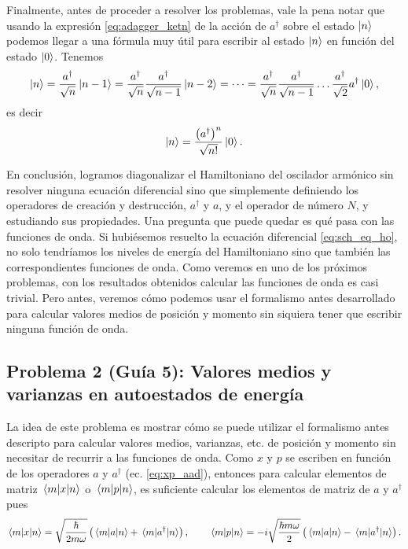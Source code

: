 \documentclass[10pt, a4paper]{article}
\newcommand{\xprefactsq}{\frac{\hbar}{2m\omega}}
\newcommand{\xprefact}{\sqrt{\xprefactsq}}
\newcommand{\pprefactsq}{\frac{\hbar m \omega}{2}}
\newcommand{\pprefact}{\sqrt{\pprefactsq}}
\numberwithin{equation}{subsection}
\begin{document}
\bigbreak

Finalmente, antes de proceder a resolver los problemas, vale la pena notar que
usando la expresión \eqref{eq:adagger_ketn} de la acción de $a^\dagger$ sobre
el estado $\ket{n}$ podemos llegar a una fórmula muy útil para escribir al
estado $\ket{n}$ en función del estado $\ket{0}$. Tenemos
\begin{equation}
  \ket{n} = \frac{a^\dagger}{\sqrt{n}}\ket{n-1} = \frac{a^\dagger}{\sqrt{n}}
    \frac{a^\dagger}{\sqrt{n-1}} \ket{n-2} = \dots = \frac{a^\dagger}{\sqrt{n}}
    \frac{a^\dagger}{\sqrt{n-1}} \dots \frac{a^\dagger}{\sqrt{2}}
    a^\dagger\ket{0},
\end{equation}
es decir
\begin{equation} \label{eq:ketn_ket0}
  \ket{n} = \frac{\left(a^\dagger\right)^n}{\sqrt{n!}}\ket{0}.
\end{equation}

\bigbreak

En conclusión, logramos diagonalizar el Hamiltoniano del oscilador armónico sin
resolver ninguna ecuación diferencial sino que simplemente definiendo los
operadores de creación y destrucción, $a^\dagger$ y $a$, y el operador de
número $N$, y estudiando sus propiedades. Una pregunta que puede quedar es qué
pasa con las funciones de onda. Si hubiésemos resuelto la ecuación diferencial
\eqref{eq:sch_eq_ho}, no solo tendríamos los niveles de energía del
Hamiltoniano sino que también las correspondientes funciones de onda. Como
veremos en uno de los próximos problemas, con los resultados obtenidos calcular
las funciones de onda es casi trivial. Pero antes, veremos cómo podemos usar el
formalismo antes desarrollado para calcular valores medios de posición y
momento sin siquiera tener que escribir ninguna función de onda.

\subsection{Problema 2 (Guía 5):
  Valores medios y varianzas en autoestados de energía} \label{sec:expval_ketn}

La idea de este problema es mostrar cómo se puede utilizar el formalismo antes
descripto para calcular valores medios, varianzas, etc. de posición y momento
sin necesitar de recurrir a las funciones de onda. Como $x$ y $p$ se escriben
en función de los operadores $a$ y $a^\dagger$ (ec. \eqref{eq:xp_aad}),
entonces para calcular elementos de matriz $\matrixel{m}{x}{n}$ o
$\matrixel{m}{p}{n}$, es suficiente calcular los elementos de matriz de $a$ y
$a^\dagger$ pues
\begin{equation}
  \matrixel{m}{x}{n} = \xprefact\left(\matrixel{m}{a}{n} +
    \matrixel{m}{a^\dagger}{n}\right), \qquad
  \matrixel{m}{p}{n} = -i\pprefact\left(\matrixel{m}{a}{n} -
    \matrixel{m}{a^\dagger}{n}\right).
\end{equation}
\end{document}
